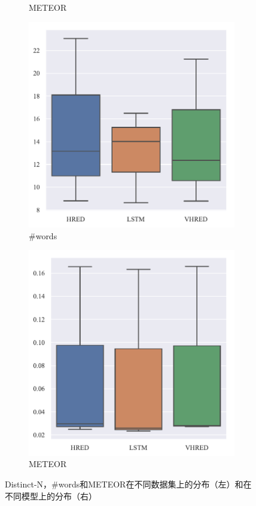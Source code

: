 \begin{figure}[H]
\begin{subfigure}{0.25\linewidth}
        \caption{METEOR}
    \end{subfigure}%
    \begin{subfigure}{0.25\linewidth}
        \centering
        \includegraphics[width=\linewidth]{figure/boxplot/model/utterance_len/plot.pdf}
        \caption{\#words}
    \end{subfigure}%
    \begin{subfigure}{0.25\linewidth}
        \centering
        \includegraphics[width=\linewidth]{figure/boxplot/model/meteor/plot.pdf}
        \caption{METEOR}
    \end{subfigure}
    \caption{Distinct-N，\#words和METEOR在不同数据集上的分布（左）和在不同模型上的分布（右）}
    \label{fig:Other_dataset}
\end{figure}
